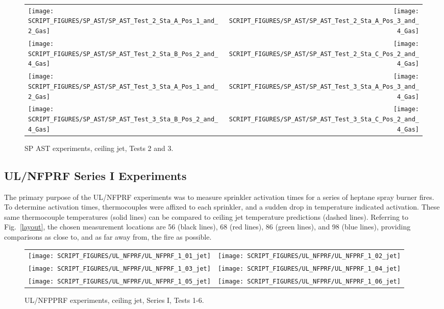 \begin{figure}[p]
\begin{tabular*}{\textwidth}{l@{\extracolsep{\fill}}r}
\texttt{[image: SCRIPT\_FIGURES/SP\_AST/SP\_AST\_Test\_2\_Sta\_A\_Pos\_1\_and\_2\_Gas]} &
\texttt{[image: SCRIPT\_FIGURES/SP\_AST/SP\_AST\_Test\_2\_Sta\_A\_Pos\_3\_and\_4\_Gas]} \\
\texttt{[image: SCRIPT\_FIGURES/SP\_AST/SP\_AST\_Test\_2\_Sta\_B\_Pos\_2\_and\_4\_Gas]} &
\texttt{[image: SCRIPT\_FIGURES/SP\_AST/SP\_AST\_Test\_2\_Sta\_C\_Pos\_2\_and\_4\_Gas]} \\
\texttt{[image: SCRIPT\_FIGURES/SP\_AST/SP\_AST\_Test\_3\_Sta\_A\_Pos\_1\_and\_2\_Gas]} &
\texttt{[image: SCRIPT\_FIGURES/SP\_AST/SP\_AST\_Test\_3\_Sta\_A\_Pos\_3\_and\_4\_Gas]} \\
\texttt{[image: SCRIPT\_FIGURES/SP\_AST/SP\_AST\_Test\_3\_Sta\_B\_Pos\_2\_and\_4\_Gas]} &
\texttt{[image: SCRIPT\_FIGURES/SP\_AST/SP\_AST\_Test\_3\_Sta\_C\_Pos\_2\_and\_4\_Gas]}
\end{tabular*}
\caption[SP AST experiments, ceiling jet, Tests 2 and 3]{SP AST experiments, ceiling jet, Tests 2 and 3.}
\label{SP_Test_2_3_Gas}
\end{figure}


\clearpage

\subsection{UL/NFPRF Series I Experiments}

The primary purpose of the UL/NFPRF experiments was to measure sprinkler activation times for a series of heptane spray burner fires. To determine activation times, thermocouples were affixed to each sprinkler, and a sudden drop in temperature indicated activation. These same thermocouple temperatures (solid lines) can be compared to ceiling jet temperature predictions (dashed lines). Referring to Fig.~\ref{layout}, the chosen measurement locations are 56 (black lines), 68 (red lines), 86 (green lines), and 98 (blue lines), providing comparisons as close to, and as far away from, the fire as possible. 


\begin{figure}[h!]
\begin{tabular*}{\textwidth}{l@{\extracolsep{\fill}}r}
\texttt{[image: SCRIPT\_FIGURES/UL\_NFPRF/UL\_NFPRF\_1\_01\_jet]} &
\texttt{[image: SCRIPT\_FIGURES/UL\_NFPRF/UL\_NFPRF\_1\_02\_jet]} \\
\texttt{[image: SCRIPT\_FIGURES/UL\_NFPRF/UL\_NFPRF\_1\_03\_jet]} &
\texttt{[image: SCRIPT\_FIGURES/UL\_NFPRF/UL\_NFPRF\_1\_04\_jet]} \\
\texttt{[image: SCRIPT\_FIGURES/UL\_NFPRF/UL\_NFPRF\_1\_05\_jet]} &
\texttt{[image: SCRIPT\_FIGURES/UL\_NFPRF/UL\_NFPRF\_1\_06\_jet]}
\end{tabular*}
\caption[UL/NFPPRF experiments, ceiling jet, Series I, Tests 1-6]{UL/NFPPRF experiments, ceiling jet, Series I, Tests 1-6.}
\label{UL_NFPRF_jet_1}
\end{figure}

